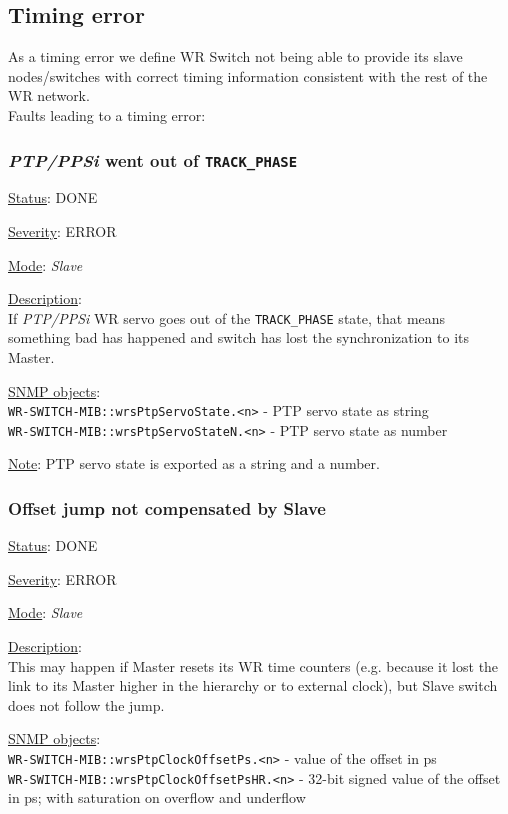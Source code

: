 \subsection{Timing error}
As a timing error we define WR Switch not being able to provide its slave
nodes/switches with correct timing information consistent with the rest of the
WR network.\\

\noindent Faults leading to a timing error:

\subsubsection{\bf \emph{PTP/PPSi} went out of \texttt{TRACK\_PHASE}}
		\label{fail:timing:ppsi_track_phase}
		\begin{packed_enum}
			\item [] \underline{Status}: DONE
			\item [] \underline{Severity}: ERROR
			\item [] \underline{Mode}: \emph{Slave}
			\item [] \underline{Description}:\\
				If \emph{PTP/PPSi} WR servo goes out of the \texttt{TRACK\_PHASE} state,
				that means something bad has happened and switch has lost the
				synchronization to its Master.
			\item [] \underline{SNMP objects}:\\
				\texttt{WR-SWITCH-MIB::wrsPtpServoState.<n>} - PTP servo state as string\\
				\texttt{WR-SWITCH-MIB::wrsPtpServoStateN.<n>} - PTP servo state as number
			\item [] \underline{Note}: PTP servo state is exported as a string and a number.
		\end{packed_enum}

\subsubsection{\bf Offset jump not compensated by Slave}
		\label{fail:timing:offset_jump}
		\begin{packed_enum}
			\item [] \underline{Status}: DONE
			\item [] \underline{Severity}: ERROR
			\item [] \underline{Mode}: \emph{Slave}
			\item [] \underline{Description}:\\
				This may happen if Master resets its WR time counters (e.g. because it
				lost the link to its Master higher in the hierarchy or to external
				clock), but Slave switch does not follow the jump.
			\item [] \underline{SNMP objects}:\\
				\texttt{WR-SWITCH-MIB::wrsPtpClockOffsetPs.<n>} - value of the offset in ps\\
				\texttt{WR-SWITCH-MIB::wrsPtpClockOffsetPsHR.<n>} - 32-bit signed value of the offset in ps; with
				saturation on overflow and underflow
		\end{packed_enum}

